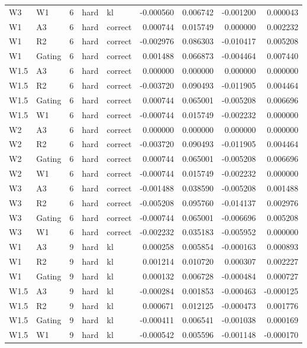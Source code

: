 \begin{tabular}{llrllrrrr}
W3 & W1 & 6 & hard & kl & -0.000560 & 0.006742 & -0.001200 & 0.000043 \\
W1 & A3 & 6 & hard & correct & 0.000744 & 0.015749 & 0.000000 & 0.002232 \\
W1 & R2 & 6 & hard & correct & -0.002976 & 0.086303 & -0.010417 & 0.005208 \\
W1 & Gating & 6 & hard & correct & 0.001488 & 0.066873 & -0.004464 & 0.007440 \\
W1.5 & A3 & 6 & hard & correct & 0.000000 & 0.000000 & 0.000000 & 0.000000 \\
W1.5 & R2 & 6 & hard & correct & -0.003720 & 0.090493 & -0.011905 & 0.004464 \\
W1.5 & Gating & 6 & hard & correct & 0.000744 & 0.065001 & -0.005208 & 0.006696 \\
W1.5 & W1 & 6 & hard & correct & -0.000744 & 0.015749 & -0.002232 & 0.000000 \\
W2 & A3 & 6 & hard & correct & 0.000000 & 0.000000 & 0.000000 & 0.000000 \\
W2 & R2 & 6 & hard & correct & -0.003720 & 0.090493 & -0.011905 & 0.004464 \\
W2 & Gating & 6 & hard & correct & 0.000744 & 0.065001 & -0.005208 & 0.006696 \\
W2 & W1 & 6 & hard & correct & -0.000744 & 0.015749 & -0.002232 & 0.000000 \\
W3 & A3 & 6 & hard & correct & -0.001488 & 0.038590 & -0.005208 & 0.001488 \\
W3 & R2 & 6 & hard & correct & -0.005208 & 0.095760 & -0.014137 & 0.002976 \\
W3 & Gating & 6 & hard & correct & -0.000744 & 0.065001 & -0.006696 & 0.005208 \\
W3 & W1 & 6 & hard & correct & -0.002232 & 0.035183 & -0.005952 & 0.000000 \\
W1 & A3 & 9 & hard & kl & 0.000258 & 0.005854 & -0.000163 & 0.000893 \\
W1 & R2 & 9 & hard & kl & 0.001214 & 0.010720 & 0.000307 & 0.002227 \\
W1 & Gating & 9 & hard & kl & 0.000132 & 0.006728 & -0.000484 & 0.000727 \\
W1.5 & A3 & 9 & hard & kl & -0.000284 & 0.001853 & -0.000463 & -0.000125 \\
W1.5 & R2 & 9 & hard & kl & 0.000671 & 0.012125 & -0.000473 & 0.001776 \\
W1.5 & Gating & 9 & hard & kl & -0.000411 & 0.006541 & -0.001038 & 0.000169 \\
W1.5 & W1 & 9 & hard & kl & -0.000542 & 0.005596 & -0.001148 & -0.000170 \\

\end{tabular}
